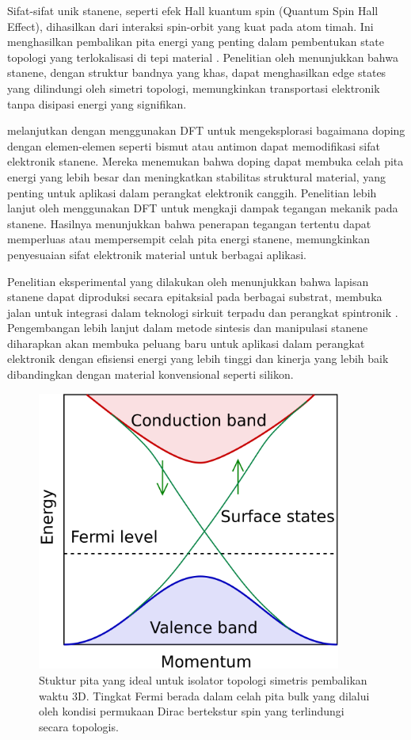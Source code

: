 Sifat-sifat unik stanene, seperti efek Hall kuantum spin (Quantum Spin Hall Effect), dihasilkan dari interaksi spin-orbit yang kuat pada atom timah. Ini menghasilkan pembalikan pita energi yang penting dalam pembentukan state topologi yang terlokalisasi di tepi material . Penelitian oleh \citep{PhysRevLett.111.136804} menunjukkan bahwa stanene, dengan struktur bandnya yang khas, dapat menghasilkan edge states yang dilindungi oleh simetri topologi, memungkinkan transportasi elektronik tanpa disipasi energi yang signifikan.

\citep{niuniu2022} melanjutkan dengan menggunakan DFT untuk mengeksplorasi bagaimana doping dengan elemen-elemen seperti bismut atau antimon dapat memodifikasi sifat elektronik stanene. Mereka menemukan bahwa doping dapat membuka celah pita energi yang lebih besar dan meningkatkan stabilitas struktural material, yang penting untuk aplikasi dalam perangkat elektronik canggih. Penelitian lebih lanjut oleh \citep{wu2020} menggunakan DFT untuk mengkaji dampak tegangan mekanik pada stanene. Hasilnya menunjukkan bahwa penerapan tegangan tertentu dapat memperluas atau mempersempit celah pita energi stanene, memungkinkan penyesuaian sifat elektronik material untuk berbagai aplikasi.

Penelitian eksperimental yang dilakukan oleh \citep{zhu2015} menunjukkan bahwa lapisan stanene dapat diproduksi secara epitaksial pada berbagai substrat, membuka jalan untuk integrasi dalam teknologi sirkuit terpadu dan perangkat spintronik . Pengembangan lebih lanjut dalam metode sintesis dan manipulasi stanene diharapkan akan membuka peluang baru untuk aplikasi dalam perangkat elektronik dengan efisiensi energi yang lebih tinggi dan kinerja yang lebih baik dibandingkan dengan material konvensional seperti silikon.

\begin{figure}
    \centering
    \includegraphics[width=10cm]{gambar/Topological_insulator_band_structure.png}
    \caption{Stuktur pita yang ideal untuk isolator topologi simetris pembalikan waktu 3D. Tingkat Fermi berada dalam celah pita bulk yang dilalui oleh kondisi permukaan Dirac bertekstur spin yang terlindungi secara topologis.}
    \label{band gap isolator topologis}
\end{figure}




